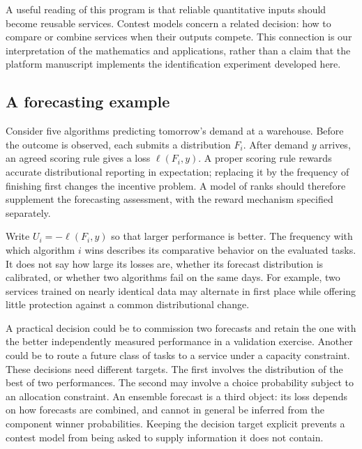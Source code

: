 \documentclass[11pt]{amsart}
\theoremstyle{definition}
\begin{document}
A useful reading of this program is that reliable quantitative inputs should become reusable services. Contest models concern a related decision: how to compare or combine services when their outputs compete. This connection is our interpretation of the mathematics and applications, rather than a claim that the platform manuscript implements the identification experiment developed here.

\subsection{A forecasting example}
Consider five algorithms predicting tomorrow's demand at a warehouse. Before the outcome is observed, each submits a distribution $F_i$. After demand $y$ arrives, an agreed scoring rule gives a loss $\ell(F_i,y)$. A proper scoring rule rewards accurate distributional reporting in expectation; replacing it by the frequency of finishing first changes the incentive problem. A model of ranks should therefore supplement the forecasting assessment, with the reward mechanism specified separately.

Write $U_i=-\ell(F_i,y)$ so that larger performance is better. The frequency with which algorithm $i$ wins describes its comparative behavior on the evaluated tasks. It does not say how large its losses are, whether its forecast distribution is calibrated, or whether two algorithms fail on the same days. For example, two services trained on nearly identical data may alternate in first place while offering little protection against a common distributional change.

A practical decision could be to commission two forecasts and retain the one with the better independently measured performance in a validation exercise. Another could be to route a future class of tasks to a service under a capacity constraint. These decisions need different targets. The first involves the distribution of the best of two performances. The second may involve a choice probability subject to an allocation constraint. An ensemble forecast is a third object: its loss depends on how forecasts are combined, and cannot in general be inferred from the component winner probabilities. Keeping the decision target explicit prevents a contest model from being asked to supply information it does not contain.
\end{document}
